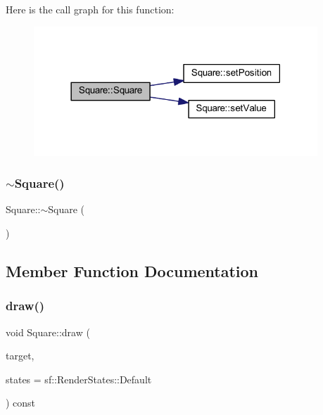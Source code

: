 Here is the call graph for this function\+:\nopagebreak
\begin{figure}[H]
\begin{center}
\leavevmode
\includegraphics[width=302pt]{class_square_a53fbf885454472fc818f541ecae5a80f_cgraph}
\end{center}
\end{figure}
\mbox{\label{class_square_a90af7ce1060cff7b717ceddb333846b8}} 
\subsubsection{\texorpdfstring{$\sim$\+Square()}{~Square()}}
{\footnotesize\ttfamily Square\+::$\sim$\+Square (\begin{DoxyParamCaption}{ }\end{DoxyParamCaption})}



\subsection{Member Function Documentation}
\mbox{\label{class_square_a6665fa34ce5e672a880a253b1a21fb78}} 
\subsubsection{\texorpdfstring{draw()}{draw()}}
{\footnotesize\ttfamily void Square\+::draw (\begin{DoxyParamCaption}\item[{sf\+::\+Render\+Target \&}]{target,  }\item[{sf\+::\+Render\+States}]{states = {\ttfamily sf\+:\+:RenderStates\+:\+:Default} }\end{DoxyParamCaption}) const\hspace{0.3cm}{\ttfamily [virtual]}}

